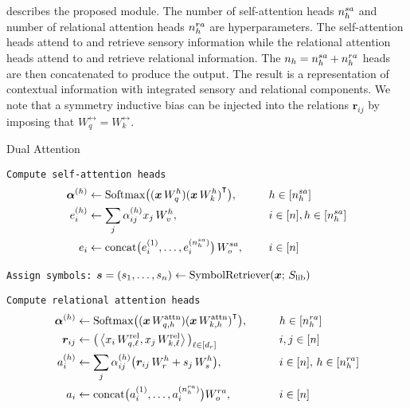  describes the proposed module. The number of self-attention heads $n_h^{sa}$ and number of relational attention heads $n_h^{ra}$ are hyperparameters. The self-attention heads attend to and retrieve sensory information while the relational attention heads attend to and retrieve relational information. The $n_h = n_h^{sa} + n_h^{ra}$ heads are then concatenated to produce the output. The result is a representation of contextual information with integrated sensory and relational components. We note that a symmetry inductive bias can be injected into the relations $\bm{r}_{ij}$ by imposing that $W_{q}^{\rel} = W_k^{\rel}$.

\begin{algorithm}[ht!]
	\caption{Dual Attention}\label{alg:dual_head_attn}

    \vspace{1em}

    \texttt{Compute self-attention heads}
    \begin{align*}
        \bm{\alpha}^{(h)} &\gets \mathrm{Softmax}\big({(\bm{x} \, W_q^h)} {(\bm{x} \, W_k^h)}^\intercal\big), \qquad && h \in [n_h^{sa}] \\
        e_i^{(h)} &\gets \sum_{j} \alpha_{ij}^{(h)} x_j \, W_v^h, \qquad && i \in [n], h \in [n_h^{sa}]\\
        e_i &\gets \mathrm{concat}\big(e_i^{(1)}, \ldots, e_i^{(n_h^{sa})}\big) \, W_o^{sa}, && i \in [n]
    \end{align*}

    \texttt{Assign symbols:} $\bm{s} = (s_1, \ldots, s_n) \gets \mathrm{SymbolRetriever}(\bm{x};\,S_\mathrm{lib})$

    \texttt{Compute relational attention heads}
    \begin{align*}
        \bm{\alpha}^{(h)} &\gets \mathrm{Softmax}\big({(\bm{x} \, W_{q, h}^{\mathrm{attn}})} {(\bm{x} \, W_{k, h}^{\mathrm{attn}})}^\intercal\big), \qquad && h \in [n_h^{ra}] \\
        \bm{r}_{ij} &\gets \big(\left \langle x_i \, W_{q, \ell}^{\mathrm{rel}}, x_j \, W_{k, \ell}^{\mathrm{rel}} \right\rangle\big)_{\ell \in [d_r]} \qquad && i,j \in [n] \\
        a_i^{(h)} &\gets \sum_{j} \alpha_{ij}^{(h)} \big(\bm{r}_{ij}\,W_r^h + s_j \, W_s^{h}\big), \qquad && i \in [n],\, h \in [n_h^{ra}]\\
        a_i &\gets \mathrm{concat}\big(a_i^{(1)}, \ldots, a_i^{(n_h^{ra})}\big) W_o^{ra}, && i \in [n]
    \end{align*}


\end{algorithm}

